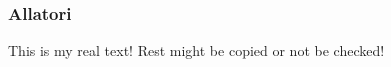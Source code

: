 \subsubsection{Allatori} \label{subsubsection:counter-reengineering-optobf-allatori}
This is my real text! Rest might be copied or not be checked!
